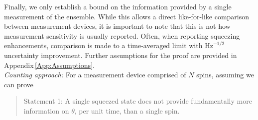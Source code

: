 \documentclass[reqno]{amsart}
\def\est#1{\tilde{#1}}
\begin{document}
Finally, we only establish a bound on the information provided by a single measurement of the ensemble. While this allows a direct like-for-like comparison between measurement devices, it is important to note that this is not how measurement sensitivity is usually reported. Often, when reporting squeezing enhancements, comparison is made to a time-averaged limit with $\mathrm{Hz}^{-1/2}$ uncertainty improvement. Further assumptions for the proof are provided in Appendix\,\ref{App:Assumptions}.\\


\emph{Counting approach:} For a measurement device comprised of $N$ spins, assuming we can prove
\begin{quotation}
Statement 1: A single squeezed state does not provide fundamentally more information on $\theta$, per unit time, than a single spin.
\end{quotation}
\end{document}
